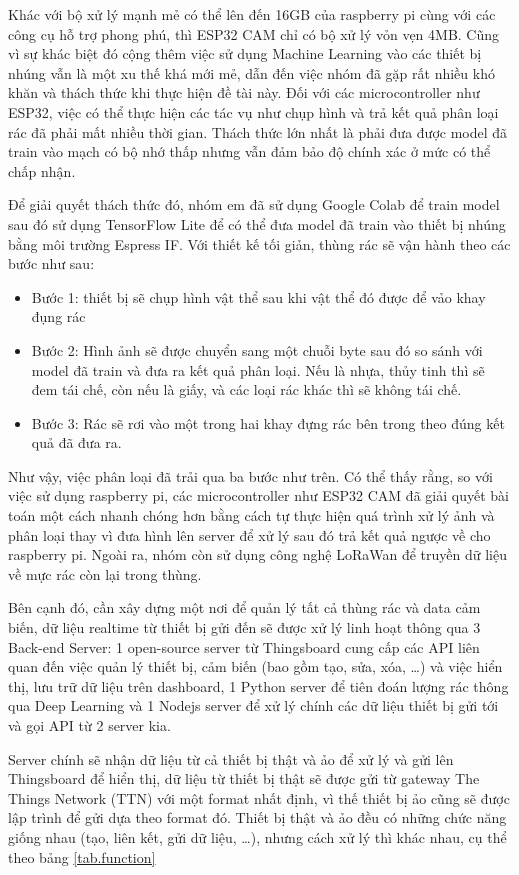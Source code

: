 Khác với bộ xử lý mạnh mẻ có thể lên đến 16GB của raspberry pi cùng với các công cụ hỗ trợ phong phú, thì ESP32 CAM chỉ có bộ xử lý vỏn vẹn 4MB.
Cũng vì sự khác biệt đó cộng thêm việc sử dụng Machine Learning vào các thiết bị nhúng vẫn là một xu thế khá mới mẻ, dẫn đến việc nhóm đã gặp rất nhiều khó khăn và thách thức khi thực hiện đề tài này.
Đối với các microcontroller như ESP32, việc có thể thực hiện các tác vụ như chụp hình và trả kết quả phân loại rác đã phải mất nhiều thời gian.
Thách thức lớn nhất là phải đưa được model đã train vào mạch có bộ nhớ thấp nhưng vẫn đảm bảo độ chính xác ở mức có thể chấp nhận. 

Để giải quyết thách thức đó, nhóm em đã sử dụng Google Colab để train model sau đó sử dụng TensorFlow Lite để có thể đưa model đã train vào thiết bị nhúng bằng môi trường Espress IF.
Với thiết kế tối giản, thùng rác sẽ vận hành theo các bước như sau: 
\begin{itemize}
    \item Bước 1: thiết bị sẽ chụp hình vật thể sau khi vật thể đó được để vảo khay đụng rác
    \item Bước 2: Hình ảnh sẽ được chuyển sang một chuỗi byte sau đó so sánh với model đã train và đưa ra kết quả phân loại. Nếu là nhựa, thủy tinh thì sẽ đem tái chế, còn nếu là giấy, và các loại rác khác thì sẽ không tái chế.
    \item Bước 3: Rác sẽ rơi vào một trong hai khay đựng rác bên trong theo đúng kết quả đã đưa ra.
\end{itemize}
Như vậy, việc phân loại đã trải qua ba bước như trên.
Có thể thấy rằng, so với việc sử dụng raspberry pi, các microcontroller như ESP32 CAM đã giải quyết bài toán một cách nhanh chóng hơn bằng cách tự thực hiện quá trình xử lý ảnh và phân loại thay vì đưa hình lên server để xử lý sau đó trả kết quả ngược về cho raspberry pi.
Ngoài ra, nhóm còn sử dụng công nghệ LoRaWan để truyền dữ liệu về mực rác còn lại trong thùng.


Bên cạnh đó, cần xây dựng một nơi để quản lý tất cả thùng rác và data cảm biến, dữ liệu realtime từ thiết bị gửi đến sẽ được xử lý linh hoạt thông qua 3 Back-end Server: 1 open-source server từ Thingsboard cung cấp các API liên quan đến việc quản lý thiết bị, cảm biến (bao gồm tạo, sửa, xóa, …) và việc hiển thị, lưu trữ dữ liệu trên dashboard, 1 Python server để tiên đoán lượng rác thông qua Deep Learning và 1 Nodejs server để xử lý chính các dữ liệu thiết bị gửi tới và gọi API từ 2 server kia.

Server chính sẽ nhận dữ liệu từ cả thiết bị thật và ảo để xử lý và gửi lên Thingsboard để hiển thị, dữ liệu từ thiết bị thật sẽ được gửi từ gateway The Things Network (TTN) với một format nhất định, vì thế thiết bị ảo cũng sẽ được lập trình để gửi dựa theo format đó. Thiết bị thật và ảo đều có những chức năng giống nhau (tạo, liên kết, gửi dữ liệu, …), nhưng cách xử lý thì khác nhau, cụ thể theo bảng \ref{tab.function}

